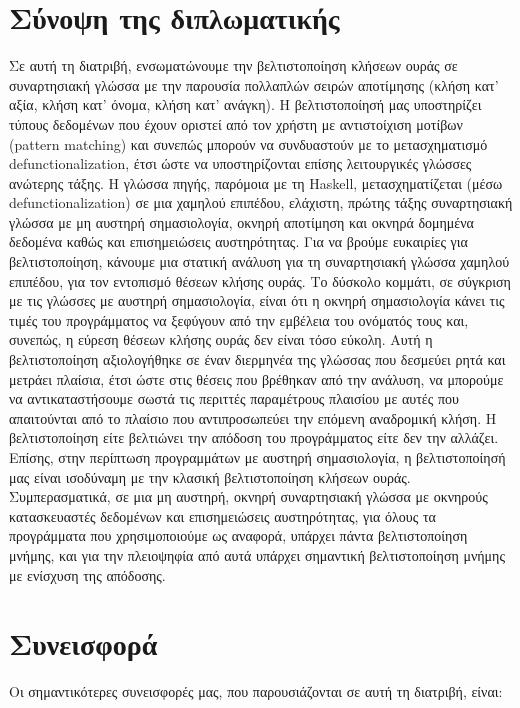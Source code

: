\documentclass[diploma]{softlab-thesis}
\begin{document}
\section{Σύνοψη της διπλωματικής}

Σε αυτή τη διατριβή, ενσωματώνουμε την βελτιστοποίηση κλήσεων ουράς σε συναρτησιακή
γλώσσα με την παρουσία πολλαπλών σειρών αποτίμησης (κλήση κατ' αξία, κλήση κατ' όνομα, κλήση κατ' ανάγκη).
Η βελτιστοποίησή μας υποστηρίζει τύπους δεδομένων που έχουν οριστεί από τον χρήστη με αντιστοίχιση 
μοτίβων (pattern matching) και συνεπώς μπορούν να συνδυαστούν με το
μετασχηματισμό defunctionalization, έτσι ώστε να υποστηρίζονται επίσης λειτουργικές γλώσσες ανώτερης τάξης. 
Η γλώσσα πηγής, παρόμοια με τη Haskell,
μετασχηματίζεται (μέσω defunctionalization) σε μια χαμηλού επιπέδου, ελάχιστη, πρώτης τάξης συναρτησιακή 
γλώσσα
με μη αυστηρή σημασιολογία, οκνηρή αποτίμηση και οκνηρά δομημένα δεδομένα καθώς και επισημειώσεις 
αυστηρότητας. Για να βρούμε ευκαιρίες για βελτιστοποίηση, κάνουμε μια στατική ανάλυση για τη
συναρτησιακή γλώσσα χαμηλού επιπέδου, για τον εντοπισμό θέσεων κλήσης ουράς. Το δύσκολο κομμάτι,
σε σύγκριση με τις γλώσσες με αυστηρή σημασιολογία, είναι ότι η οκνηρή σημασιολογία κάνει τις τιμές 
του προγράμματος να ξεφύγουν από την εμβέλεια του ονόματός τους
και, συνεπώς, η εύρεση θέσεων κλήσης ουράς δεν είναι τόσο εύκολη. Αυτή η βελτιστοποίηση αξιολογήθηκε
σε έναν διερμηνέα της γλώσσας που δεσμεύει ρητά και μετράει πλαίσια, έτσι ώστε
στις θέσεις που βρέθηκαν από την ανάλυση, να μπορούμε να αντικαταστήσουμε σωστά τις περιττές παραμέτρους
πλαισίου με αυτές που απαιτούνται από το πλαίσιο που αντιπροσωπεύει την επόμενη αναδρομική κλήση.
Η βελτιστοποίηση είτε βελτιώνει την απόδοση του προγράμματος είτε δεν την αλλάζει. Επίσης, 
στην περίπτωση προγραμμάτων με αυστηρή σημασιολογία, η βελτιστοποίησή μας είναι ισοδύναμη με την κλασική 
βελτιστοποίηση κλήσεων ουράς. Συμπερασματικά,
σε μια μη αυστηρή, οκνηρή συναρτησιακή γλώσσα με οκνηρούς κατασκευαστές δεδομένων και 
επισημειώσεις αυστηρότητας, για όλους τα προγράμματα που χρησιμοποιούμε ως αναφορά, υπάρχει πάντα 
βελτιστοποίηση μνήμης, 
και για την πλειοψηφία
από αυτά υπάρχει σημαντική βελτιστοποίηση μνήμης με ενίσχυση της απόδοσης.

\section{Συνεισφορά}

Οι σημαντικότερες συνεισφορές μας, που παρουσιάζονται σε αυτή τη διατριβή, είναι:
\end{document}
